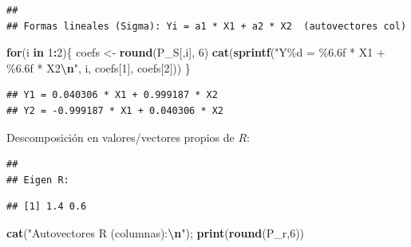 \documentclass[
]{book}
\newenvironment{Shaded}{\begin{snugshade}}{\end{snugshade}}
\newcommand{\ControlFlowTok}[1]{\textcolor[rgb]{0.13,0.29,0.53}{\textbf{#1}}}
\newcommand{\DecValTok}[1]{\textcolor[rgb]{0.00,0.00,0.81}{#1}}
\newcommand{\FunctionTok}[1]{\textcolor[rgb]{0.13,0.29,0.53}{\textbf{#1}}}
\newcommand{\NormalTok}[1]{#1}
\newcommand{\OtherTok}[1]{\textcolor[rgb]{0.56,0.35,0.01}{#1}}
\newcommand{\SpecialCharTok}[1]{\textcolor[rgb]{0.81,0.36,0.00}{\textbf{#1}}}
\newcommand{\StringTok}[1]{\textcolor[rgb]{0.31,0.60,0.02}{#1}}
\begin{document}
\begin{verbatim}
## 
## Formas lineales (Sigma): Yi = a1 * X1 + a2 * X2  (autovectores col)
\end{verbatim}

\begin{Shaded}
\begin{Highlighting}[]
\ControlFlowTok{for}\NormalTok{(i }\ControlFlowTok{in} \DecValTok{1}\SpecialCharTok{:}\DecValTok{2}\NormalTok{)\{}
\NormalTok{  coefs }\OtherTok{\textless{}{-}} \FunctionTok{round}\NormalTok{(P\_S[,i], }\DecValTok{6}\NormalTok{)}
  \FunctionTok{cat}\NormalTok{(}\FunctionTok{sprintf}\NormalTok{(}\StringTok{"Y\%d = \%6.6f * X1 + \%6.6f * X2}\SpecialCharTok{\textbackslash{}n}\StringTok{"}\NormalTok{, i, coefs[}\DecValTok{1}\NormalTok{], coefs[}\DecValTok{2}\NormalTok{]))}
\NormalTok{\}}
\end{Highlighting}
\end{Shaded}

\begin{verbatim}
## Y1 = 0.040306 * X1 + 0.999187 * X2
## Y2 = -0.999187 * X1 + 0.040306 * X2
\end{verbatim}

Descomposición en valores/vectores propios de \(R\):

\begin{Shaded}
\end{Shaded}

\begin{verbatim}
## 
## Eigen R:
\end{verbatim}

\begin{verbatim}
## [1] 1.4 0.6
\end{verbatim}

\begin{Shaded}
\begin{Highlighting}[]
\FunctionTok{cat}\NormalTok{(}\StringTok{"Autovectores R (columnas):}\SpecialCharTok{\textbackslash{}n}\StringTok{"}\NormalTok{); }\FunctionTok{print}\NormalTok{(}\FunctionTok{round}\NormalTok{(P\_r,}\DecValTok{6}\NormalTok{))}
\end{Highlighting}
\end{Shaded}
\end{document}
